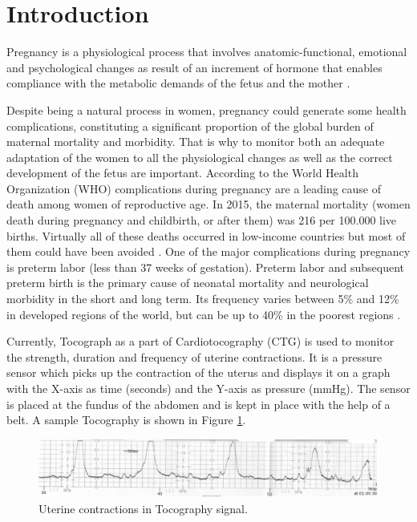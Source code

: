 \documentclass[bioengineering,article,submit,moreauthors,pdftex,10pt,a4paper]{mdpi}
\begin{document}
\section{Introduction}

Pregnancy is a physiological process that involves
anatomic-functional, emotional and psychological changes as
result of an increment of hormone that enables compliance
with the metabolic demands of the fetus and the mother \cite{ref-weisswolfe}.

Despite being a natural process in women, pregnancy could
generate some health complications, constituting a significant
proportion of the global burden of maternal mortality and
morbidity. That is why to monitor both an adequate
adaptation of the women to all the physiological changes as
well as the correct development of the fetus are important.
According to the World Health Organization (WHO)
complications during pregnancy are a leading cause of death
among women of reproductive age. In 2015, the maternal mortality (women death during pregnancy and childbirth, or after them) was 216 per 100.000 live births. Virtually
all of these deaths occurred in low-income countries but most
of them could have been avoided \cite{ref-twb}. One of the major
complications during pregnancy is preterm labor (less than 37
weeks of gestation). Preterm labor and subsequent preterm
birth is the primary cause of neonatal mortality and
neurological morbidity in the short and long term. Its
frequency varies between 5\% and 12\% in developed regions
of the world, but can be up to 40\% in the poorest regions \cite{ref-villa}. 


Currently, Tocograph as a part of Cardiotocography (CTG) is
used to monitor the strength, duration and frequency of uterine
contractions. It is a pressure sensor which picks up the
contraction of the uterus and displays it on a graph with the X-axis as time (seconds) and the Y-axis as pressure (mmHg).
The sensor is placed at the fundus of the abdomen and is kept
in place with the help of a belt. A sample Tocography is
shown in Figure \ref{toco}.

 \begin{figure}[H]
 	\caption{\label{toco} Uterine contractions in Tocography signal.}
 	\begin{center}
 		\includegraphics[scale=0.45]{imagens/toco.jpg} 		
 	\end{center}
 \end{figure}
 
\end{document}
